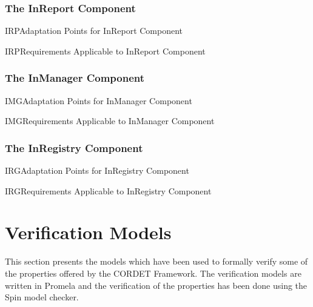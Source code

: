 \documentclass{pnp_article}
\begin{document}
\subsubsection{The InReport Component}\label{sec:InReport}


\begin{crAp}{IRP}{Adaptation Points for InReport Component}
\end{crAp}

\begin{crReq}{IRP}{Requirements Applicable to InReport Component}
\end{crReq}

\subsubsection{The InManager Component}\label{sec:InManager}


\begin{crAp}{IMG}{Adaptation Points for InManager Component}
\end{crAp}

\begin{crReq}{IMG}{Requirements Applicable to InManager Component}
\end{crReq}

\subsubsection{The InRegistry Component}\label{sec:InRegistry}


\begin{crAp}{IRG}{Adaptation Points for InRegistry Component}
\end{crAp}

\begin{crReq}{IRG}{Requirements Applicable to InRegistry Component}
\end{crReq}


\appendix
\section{Verification Models}\label{sec:VerModels}
This section presents the models which have been used to formally verify some of the properties offered by the CORDET Framework. The verification models are written in Promela and the verification of the properties has been done using the Spin model checker.
\end{document}
